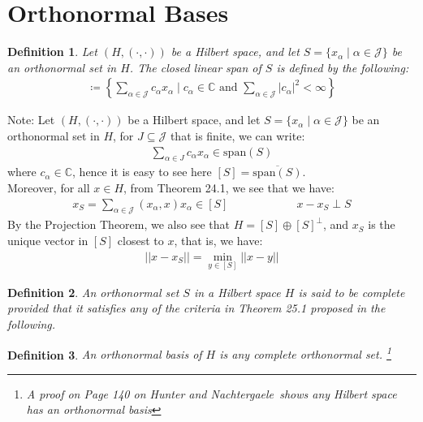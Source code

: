 \documentclass[11pt]{book}
\theoremstyle{break}
\theoremstyle{break}
\newtheorem{defn}{Definition}[corL]
\newcommand{\C}{\mathbb{C}}
\newcommand{\spa}{\text{span}}
\newcommand{\txt}{\textit{Hunter and Nachtergaele}}
\newcommand{\note}{\color{red}Note: \color{black}}
\begin{document}
\newpage
\section[Orthonormal Bases]{\color{red} Orthonormal Bases\color{black}}
\begin{defn}
Let $(H, (\cdot,\cdot))$ be a Hilbert space, and let $S = \{ x_\alpha \mid \alpha \in \mathcal{J}\}$ be an orthonormal set in $H$. The closed linear span of $S$ is defined by the following:
\begin{align*}
[S]\coloneqq \left\{ \sum_{\alpha \in \mathcal{J}} c_\alpha x_\alpha \mid c_\alpha \in \C \text{ and } \sum_{\alpha \in \mathcal{J}}|c_\alpha |^2 < \infty\right\}
\end{align*}
\end{defn}
\note Let $(H, (\cdot,\cdot))$ be a Hilbert space, and let $S = \{ x_\alpha \mid \alpha \in \mathcal{J}\}$ be an orthonormal set in $H$, for $J \subseteq \mathcal{J}$ that is finite, 
we can write:
\begin{align*}
\sum_{\alpha \in J}c_\alpha x_\alpha \in \spa(S)
\end{align*}
where $c_\alpha \in \C$, hence it is easy to see here $[S] = \overline{\spa(S)}$. \\
Moreover, for all $x \in H$, from Theorem 24.1, we see that we have:
\begin{align*}
x_S = \sum_{\alpha \in \mathcal{J}}(x_\alpha ,x) x_\alpha \in [S]\qquad\qquad\qquad x-x_S \perp S
\end{align*}
By the Projection Theorem, we also see that $H = [S] \oplus [S]^{\perp}$, and $x_S$ is the unique vector in $[S]$ closest to $x$, that is, we have:
\begin{align*}
||x-x_S|| = \min_{y \in [S]}||x-y||
\end{align*}

\begin{defn}
An orthonormal set $S$ in a Hilbert space $H$ is said to be complete provided that it satisfies any of the criteria in Theorem 25.1 proposed in the following.
\end{defn}
\begin{defn}
An orthonormal basis of $H$ is any complete orthonormal set. \footnote{A proof on Page 140 on \txt\ shows any Hilbert space has an orthonormal basis}
\end{defn}
\end{document}
